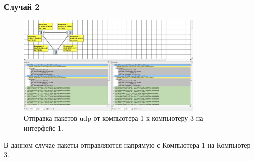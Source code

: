 \documentclass[12pt,onecolumn]{article}
\begin{document}
\subsubsection{Случай 2}
\begin{figure}[H]
  \centering
  \includegraphics[width=0.8\textwidth]{image/part3/udp-2.png}
  \caption{Отправка пакетов udp от компьютера 1 к компьютеру 3 на интерфейс 1.}
\end{figure}
В данном случае пакеты отправляются напрямую с Компьютера 1 на Компьютер 3.
\end{document}
